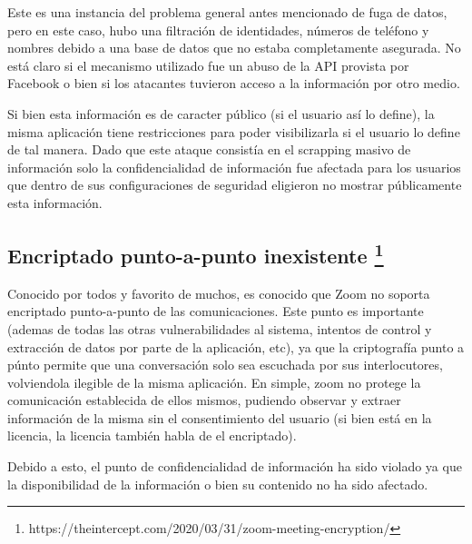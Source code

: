 \documentclass[11pt]{utalcaDoc}
\begin{document}
Este es una instancia del problema general antes mencionado de fuga de datos, pero en este caso, hubo una filtración de identidades, números de teléfono y nombres debido a una base de datos que no estaba completamente asegurada. No está claro si el mecanismo utilizado fue un abuso de la API provista por Facebook o bien si los atacantes tuvieron acceso a la información por otro medio. 

Si bien esta información es de caracter público (si el usuario así lo define), la misma aplicación tiene restricciones para poder visibilizarla si el usuario lo define de tal manera. Dado que este ataque consistía en el scrapping masivo de información solo la confidencialidad de información fue afectada para los usuarios que dentro de sus configuraciones de seguridad eligieron no mostrar públicamente esta información.

\subsection{
    Encriptado punto-a-punto inexistente
    \footnote{ https://theintercept.com/2020/03/31/zoom-meeting-encryption/ }
}

Conocido por todos y favorito de muchos, es conocido que Zoom no soporta encriptado punto-a-punto de las comunicaciones. Este punto es importante (ademas de todas las otras vulnerabilidades al sistema, intentos de control y extracción de datos por parte de la aplicación, etc), ya que la criptografía punto a púnto permite que una conversación solo sea escuchada por sus interlocutores, volviendola ilegible de la misma aplicación. En simple, zoom no protege la comunicación establecida de ellos mismos, pudiendo observar y extraer información de la misma sin el consentimiento del usuario (si bien está en la licencia, la licencia también habla de el encriptado).

Debido a esto, el punto de confidencialidad de información ha sido violado ya que la disponibilidad de la información o bien su contenido no ha sido afectado.
\end{document}
